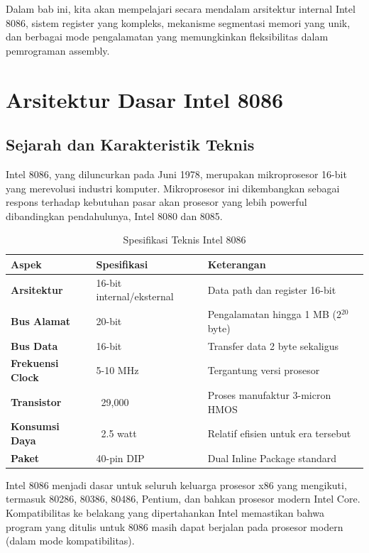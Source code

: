 \documentclass[../main.tex]{subfiles}
\begin{document}
Dalam bab ini, kita akan mempelajari secara mendalam arsitektur internal Intel 8086, sistem register yang kompleks, mekanisme segmentasi memori yang unik, dan berbagai mode pengalamatan yang memungkinkan fleksibilitas dalam pemrograman assembly.

\section{Arsitektur Dasar Intel 8086}

\subsection{Sejarah dan Karakteristik Teknis}
Intel 8086, yang diluncurkan pada Juni 1978, merupakan mikroprosesor 16-bit yang merevolusi industri komputer. Mikroprosesor ini dikembangkan sebagai respons terhadap kebutuhan pasar akan prosesor yang lebih powerful dibandingkan pendahulunya, Intel 8080 dan 8085.

\begin{table}[h]
\centering
\caption{Spesifikasi Teknis Intel 8086}
\begin{tabular}{|p{4cm}|p{3cm}|p{8cm}|}
\hline
\textbf{Aspek} & \textbf{Spesifikasi} & \textbf{Keterangan} \\
\hline
\textbf{Arsitektur} & 16-bit internal/eksternal & Data path dan register 16-bit \\
\hline
\textbf{Bus Alamat} & 20-bit & Pengalamatan hingga 1 MB (2$^{20}$ byte) \\
\hline
\textbf{Bus Data} & 16-bit & Transfer data 2 byte sekaligus \\
\hline
\textbf{Frekuensi Clock} & 5-10 MHz & Tergantung versi prosesor \\
\hline
\textbf{Transistor} & ~29,000 & Proses manufaktur 3-micron HMOS \\
\hline
\textbf{Konsumsi Daya} & ~2.5 watt & Relatif efisien untuk era tersebut \\
\hline
\textbf{Paket} & 40-pin DIP & Dual Inline Package standard \\
\hline
\end{tabular}
\label{tab:8086-specifications}
\end{table}

Intel 8086 menjadi dasar untuk seluruh keluarga prosesor x86 yang mengikuti, termasuk 80286, 80386, 80486, Pentium, dan bahkan prosesor modern Intel Core. Kompatibilitas ke belakang yang dipertahankan Intel memastikan bahwa program yang ditulis untuk 8086 masih dapat berjalan pada prosesor modern (dalam mode kompatibilitas).
\end{document}
